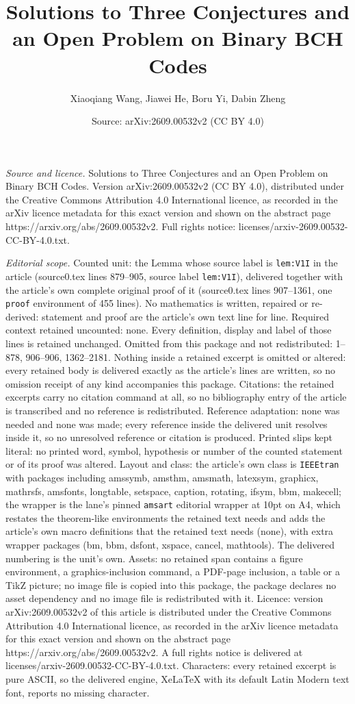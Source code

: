 \documentclass[10pt,a4paper]{amsart}
\title[Solutions to Three Conjectures and an Open Problem on Binary]{Solutions to Three Conjectures and an Open Problem on Binary BCH Codes}
\author{Xiaoqiang Wang, Jiawei He, Boru Yi, Dabin Zheng}
\date{Source: arXiv:2609.00532v2 (CC BY 4.0)}
\begin{document}
\maketitle

\noindent\emph{Source and licence.} Solutions to Three Conjectures and an Open Problem on Binary BCH Codes. Version arXiv:2609.00532v2 (CC BY 4.0), distributed under the Creative Commons Attribution 4.0 International licence, as recorded in the arXiv licence metadata for this exact version and shown on the abstract page https://arxiv.org/abs/2609.00532v2. Full rights notice: licenses/arxiv-2609.00532-CC-BY-4.0.txt.\par\smallskip

\noindent\textit{Editorial scope.} Counted unit: the Lemma whose source label is \texttt{lem:V1I} in the article (source0.tex lines 879--905, source label \texttt{lem:V1I}), delivered together with the article's own complete original proof of it (source0.tex lines 907--1361, one \texttt{proof} environment of 455 lines). No mathematics is written, repaired or re-derived: statement and proof are the article's own text line for line. Required context retained uncounted: none. Every definition, display and label of those lines is retained unchanged. Omitted from this package and not redistributed: 1--878, 906--906, 1362--2181. Nothing inside a retained excerpt is omitted or altered: every retained body is delivered exactly as the article's lines are written, so no omission receipt of any kind accompanies this package. Citations: the retained excerpts carry no citation command at all, so no bibliography entry of the article is transcribed and no reference is redistributed. Reference adaptation: none was needed and none was made; every reference inside the delivered unit resolves inside it, so no unresolved reference or citation is produced. Printed slips kept literal: no printed word, symbol, hypothesis or number of the counted statement or of its proof was altered. Layout and class: the article's own class is \texttt{IEEEtran} with packages including amssymb, amsthm, amsmath, latexsym, graphicx, mathrsfs, amsfonts, longtable, setspace, caption, rotating, ifsym, bbm, makecell; the wrapper is the lane's pinned \texttt{amsart} editorial wrapper at 10pt on A4, which restates the theorem-like environments the retained text needs and adds the article's own macro definitions that the retained text needs (none), with extra wrapper packages (bm, bbm, dsfont, xspace, cancel, mathtools). The delivered numbering is the unit's own. Assets: no retained span contains a figure environment, a graphics-inclusion command, a PDF-page inclusion, a table or a TikZ picture; no image file is copied into this package, the package declares no asset dependency and no image file is redistributed with it. Licence: version arXiv:2609.00532v2 of this article is distributed under the Creative Commons Attribution 4.0 International licence, as recorded in the arXiv licence metadata for this exact version and shown on the abstract page https://arxiv.org/abs/2609.00532v2. A full rights notice is delivered at licenses/arxiv-2609.00532-CC-BY-4.0.txt. Characters: every retained excerpt is pure ASCII, so the delivered engine, XeLaTeX with its default Latin Modern text font, reports no missing character.
\end{document}
